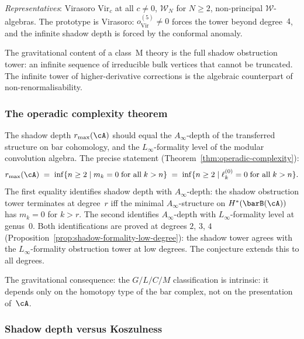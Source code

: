\emph{Representatives}: Virasoro $\mathrm{Vir}_c$ at all
$c\neq 0$, $\mathcal W_N$ for $N\ge 2$, non-principal
$\mathcal W$-algebras. The prototype is
Virasoro: $o^{(5)}_{\mathrm{Vir}}\neq 0$ forces the tower
beyond degree~$4$, and the infinite shadow depth is forced by the
conformal anomaly.

The gravitational content of a class~M theory is the full
shadow obstruction tower: an infinite sequence of irreducible
bulk vertices that cannot be truncated. The infinite tower
of higher-derivative corrections is the algebraic counterpart
of non-renormalisability.

\subsubsection*{The operadic complexity theorem}

The shadow depth $r_{\max}(\cA)$ should equal the $A_\infty$-depth
of the transferred structure on bar cohomology, and the
$L_\infty$-formality level of the modular convolution algebra.
The precise statement
(Theorem~\ref{thm:operadic-complexity}):
\[
r_{\max}(\cA)
\;=\;
\inf\{n\ge 2\mid m_k=0\;\text{for all}\;k>n\}
\;=\;
\inf\{n\ge 2\mid\ell_k^{(0)}=0\;\text{for all}\;k>n\}.
\]
The first equality identifies shadow depth with $A_\infty$-depth:
the shadow obstruction tower terminates at degree~$r$ iff the minimal
$A_\infty$-structure on $H^*(\barB(\cA))$ has $m_k=0$ for
$k>r$. The second identifies $A_\infty$-depth with
$L_\infty$-formality level at genus~$0$. Both identifications
are proved at degrees $2$, $3$, $4$
(Proposition~\ref{prop:shadow-formality-low-degree}): the shadow
tower agrees with the $L_\infty$-formality obstruction tower at
low degrees. The conjecture extends this to all degrees.

The gravitational consequence: the $G/L/C/M$ classification is
intrinsic: it depends only on the homotopy type of the bar
complex, not on the presentation of~$\cA$.

\subsubsection*{Shadow depth versus Koszulness}

